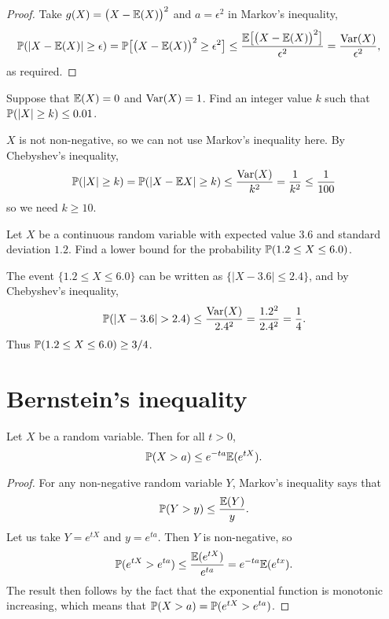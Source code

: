 \begin{proof}
Take $g(X)=\big(X-\mathbb{E}(X)\big)^2$ and $a=\epsilon^2$ in Markov's inequality,
\begin{align*}
\mathbb{P}(|X-\mathbb{E}(X)|\geq \epsilon) 
	& = \mathbb{P}\big[\big(X-\mathbb{E}(X)\big)^2\geq \epsilon^2\big] 
	\leq	\frac{\mathbb{E}\big[\big(X-\mathbb{E}(X)\big)^2\big]}{\epsilon^2} 
	= \frac{\text{Var}(X)}{\epsilon^2},
\end{align*}	
as required.
\end{proof}

\newpage

\begin{example}
Suppose that $\mathbb{E}(X) = 0$ and $\text{Var}(X) = 1$. Find an integer value $k$ such that $\mathbb{P}(|X|\geq k) \leq 0.01$.
\end{example}

\begin{solution}
$X$ is not non-negative, so we can not use Markov's inequality here. By Chebyshev's inequality,
\[
\mathbb{P}(|X|\geq k) = \mathbb{P}(|X-\mathbb{E} X|\geq k) \leq \frac{\text{Var}(X)}{k^2} = \frac{1}{k^2} \leq \frac{1}{100}
\]
so we need $k\geq 10$.
\end{solution}

\begin{example}
Let $X$ be a continuous random variable with expected value $3.6$ and standard deviation $1.2$. Find a lower bound for the probability $\mathbb{P}(1.2\leq X\leq 6.0)$.
\begin{solution} %
\par
The event $\{1.2 \leq X \leq 6.0\}$ can be written as $\{|X-3.6| \leq 2.4\}$, and by Chebyshev's inequality,
\[
\prob(|X-3.6|> 2.4) \leq \frac{\var(X)}{2.4^2} = \frac{1.2^2}{2.4^2} = \frac{1}{4}.
\]
Thus $\mathbb{P}(1.2 \leq X \leq 6.0) \geq 3/4$.
\end{solution}
\end{example}

\section{Bernstein's inequality}
\begin{theorem}\label{thm:bernstein}
Let $X$ be a random variable. Then for all $t>0$,
\[
\mathbb{P}(X>a) \leq e^{-ta}\mathbb{E}(e^{tX}).
\]
\end{theorem}
\begin{proof}
For any non-negative random variable $Y$, Markov's inequality says that
\[
\mathbb{P}(Y>y) \leq \frac{\mathbb{E}(Y)}{y}.
\]
Let us take $Y=e^{tX}$ and $y = e^{ta}$. Then $Y$ is non-negative, so
\[
\mathbb{P}(e^{tX} > e^{ta}) \leq \frac{\mathbb{E}(e^{tX})}{e^{ta}} = e^{-ta}\mathbb{E}(e^{tx}).
\]
The result then follows by the fact that the exponential function is monotonic increasing, which means that $\mathbb{P}(X > a)=\mathbb{P}(e^{tX} > e^{ta})$.
\end{proof}

